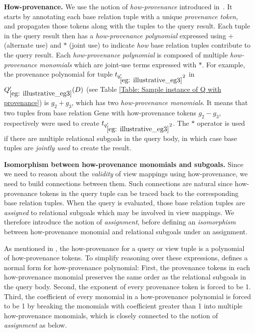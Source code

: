 \textbf{How-provenance.} We use the notion of {\em how-provenance} introduced in~\cite{green2007provenance}. It starts by annotating each base relation tuple with a unique {\em provenance token}, and propagates those tokens along with the tuples to the query result.  Each tuple in the query result then has a {\em how-provenance polynomial} expressed using $+$ (alternate use) and $*$ (joint use) to indicate {\em how} base relation tuples contribute to the query result. Each {\em how-provenance polynomial} is composed of multiple {\em how-provenance monomials} which are joint-use terms expressed with $*$. For example, the provenance polynomial for tuple $t_{q_{\ref{eg: illustrative_eg3}}'2}$ in $Q_{\ref{eg: illustrative_eg3}}'(D)$ (see Table \ref{Table: Sample instance of Q with provenance}) is $g_2 + g_3$, which has two \textit{how-provenance monomials}. It means that two tuples from base relation Gene with how-provenance tokens $g_2 - g_3$, respectively
were used to create $t_{q_{\ref{eg: illustrative_eg3}}'2}$.  The $*$ operator is used if there are multiple relational subgoals in the query body, in which case base tuples are {\em jointly used} to create the result.


\textbf{Isomorphism between how-provenance monomials and subgoals.} Since we need to reason about the \textit{validity} of view mappings using how-provenance, we need to build connections between them. Such connections are natural since how-provenance tokens in the query tuple can be traced back to the corresponding base relation tuples. When the query is evaluated, those base relation tuples are {\em assigned} to relational subgoals which may be involved in view mappings.
We therefore introduce the notion of {\em assignment}, before defining an {\em isomorphism} between how-provenance monomial and relational subgoals under an assignment.

As mentioned in \cite{green2007provenance}, the how-provenance for a query or view tuple is a polynomial of how-provenance tokens. To simplify reasoning over these expressions, \cite{amsterdamer2012provenance} defines a normal form for how-provenance polynomial: First, the provenance tokens in each how-provenance monomial preserves the same order as the relational subgoals in the query body. Second, the exponent of every provenance token is forced to be 1. Third, the coefficient of every monomial in a how-provenance polynomial is forced to be 1 by breaking the monomials with coefficient greater than 1 into multiple how-provenance monomials, which is closely connected to the notion of {\em assignment} as below.

